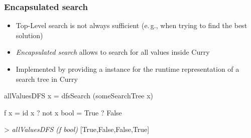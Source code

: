 \documentclass[
,hyperref={pdfpagelabels=false}
]{beamer}
\begin{document}

\begin{frame}[fragile]%
\frametitle{Encapsulated search}

\begin{itemize}
\item Top-Level search is not always sufficient (e.\,g., when trying to
      find the best solution)
\item \emph{Encapsulated search} allows to search for all values
      inside Curry
\item Implemented by providing a  instance for the runtime
      representation of a search tree in Curry
\end{itemize}

\pause

\begin{curry}
allValuesDFS x = dfsSearch (someSearchTree x)
\end{curry}

\begin{example}
\begin{program}
f x  = id x ? not x
bool = True ? False

> \textsl{allValuesDFS (f bool)}
[True,False,False,True]
\end{program}
\end{example}

\end{frame}
\end{document}
